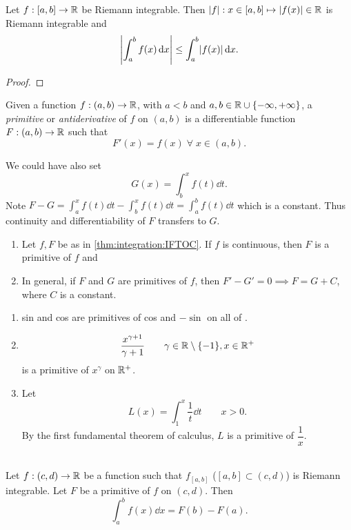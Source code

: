 \begin{thm} \label{thm:integration:triangle}
    Let $f : [a, b] \to \mathbb{R}$ be Riemann integrable.
    Then $\abs{f} : x \in [a, b] \mapsto \abs{f(x)} \in \R$ is Riemann integrable and \[
        \abs{\int_{a}^{b} f(x) \dd x} \leq \int_{a}^{b} \abs{f(x)} \dd x.
    \]
\end{thm}
\begin{proof}
\end{proof}

\begin{defn}[Primitive] \label{defn:primitive}
    Given a function $f : (a, b) \to \mathbb{R}$, with $a < b$ and $a, b \in \R \cup \set{-\infty, +\infty}$, a \emph{primitive} or \emph{antiderivative} of $f$ on $(a, b)$ is a differentiable function $F : (a, b) \to \mathbb{R}$ such that \[
        F'(x) = f(x) \;\forall\; x \in (a, b).
    \]
\end{defn}
\begin{rem}
    We could have also set \[
        G(x) = \int_{b}^{x} f(t) \dd t.
    \] Note $F - G = \int_{a}^{x} f(t) \dd t - \int_{b}^{x} f(t) \dd t = \int_{a}^{b} f(t) \dd t$ which is a constant.
    Thus continuity and differentiability of $F$ transfers to $G$.
\end{rem}
\begin{rem} \leavevmode
    \begin{enumerate}[label=(\alph*)]
        \item Let $f, F$ be as in \cref{thm:integration:IFTOC}.
        If $f$ is continuous, then $F$ is a primitive of $f$ and 
        \item In general, if $F$ and $G$ are primitives of $f$, then $F' - G' = 0 \implies F = G + C$, where $C$ is a constant.
    \end{enumerate}
\end{rem}
\begin{example} \leavevmode
    \begin{enumerate}[label=(\alph*)]
        \item sin and cos are primitives of cos and $-\sin$ on all of \R.
        \item \[
            \frac{x^{\gamma + 1}}{\gamma + 1} \qquad \gamma \in \R \setminus \set{-1}, x \in \R^{+}
        \] is a primitive of $x^{\gamma}$ on $\mathbb{R}^{+}$.
        \item Let \[
            L(x) = \int_{1}^{x} \frac{1}{t} \dd t \qquad x > 0.
        \] By the first fundamental theorem of calculus, $L$ is a primitive of $\dfrac{1}{x}$.
    \end{enumerate}
\end{example}

\begin{thm} \label{thm:integration:IIFTOC} ~\\
    Let $f : (c, d) \to \mathbb{R}$ be a function such that $f_{[a, b]}$ ($[a, b] \subset (c, d)$) is Riemann integrable. Let $F$ be a primitive of $f$ on $(c, d)$. Then \[
        \int_{a}^{b} f(x) \dd x = F(b) - F(a).
    \]
\end{thm}
